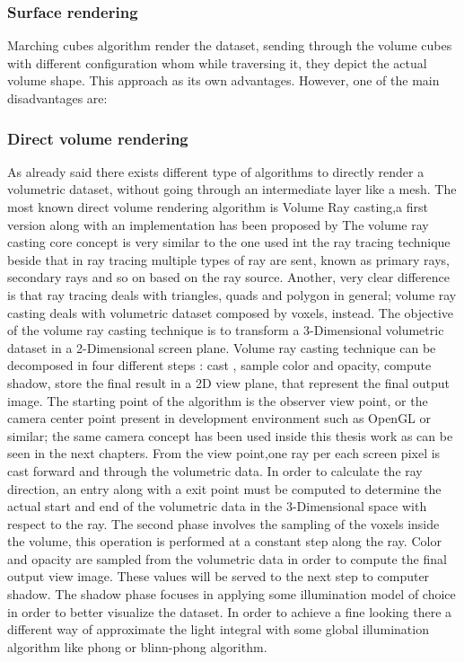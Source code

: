 \documentclass[10pt,a4paper]{article}
\begin{document}
\subsubsection{Surface rendering}
Marching cubes algorithm render the dataset, sending through the volume cubes with different configuration whom while traversing it, they depict the actual volume shape. This approach as its own advantages.
However, one of the main disadvantages are: 
\subsubsection{Direct volume rendering}
As already said there exists different type of algorithms to directly render a volumetric dataset, without going through an intermediate layer like a mesh.
The most known direct volume rendering algorithm is Volume Ray casting,a first version along with an implementation has been proposed by %
The volume ray casting core concept is very similar to the one used int the ray tracing technique beside that in ray tracing multiple types of ray are sent, known as primary rays, secondary rays and so on based on the ray source. Another, very clear difference is that ray tracing deals with triangles, quads and polygon in general; volume ray casting deals with volumetric dataset composed by voxels, instead.
The objective of the volume ray casting technique is to transform a 3-Dimensional volumetric dataset in a 2-Dimensional screen plane.
Volume ray casting technique can be decomposed in four different steps %
: cast , sample color and opacity, compute shadow, store the final result in a 2D view plane, that represent the final output image.
The starting point of the algorithm is the observer view point, or the camera center point present in development environment such as OpenGL or similar; the same camera concept has been used inside this thesis work as can be seen in the next chapters.
From the view point,one ray per each screen pixel is cast forward and through the volumetric data.
In order to calculate the ray direction, an entry along with a exit point must be computed to determine the actual start and end of the volumetric data in the 3-Dimensional space with respect to the ray.
The second phase involves the sampling of the voxels inside the volume, this operation is performed at a constant step along the ray. Color and opacity are sampled from the volumetric data in order to compute the final output view image. These values will be served to the next step to computer shadow.
The shadow phase focuses in applying some illumination model of choice in order to better visualize the dataset. In order to achieve a fine looking there a different way of approximate the light integral with some global illumination algorithm like phong or blinn-phong algorithm.
\end{document}
